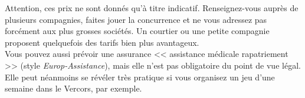\documentclass[11pt,twoside,a4paper]{article}
\begin{document}
\begin{multicols*}{2}
Attention, ces prix ne sont donn{\'e}s qu'{\`a} titre indicatif. Renseignez-vous aupr{\`e}s de plusieurs compagnies, faites jouer la concurrence et ne vous adressez pas forc{\'e}ment aux plus grosses soci{\'e}t{\'e}s. Un courtier ou une petite compagnie proposent quelquefois des tarifs bien plus avantageux. ~\\

Vous pouvez aussi pr{\'e}voir une assurance << assistance m{\'e}dicale rapatriement >> (style \emph{Europ-Assistance}), mais elle n'est pas obligatoire du point de vue l{\'e}gal. Elle peut n{\'e}anmoins se r{\'e}v{\'e}ler tr{\`e}s pratique si vous organisez un jeu d'une semaine dans le Vercors, par exemple. ~\\

\end{multicols*}
\end{document}
